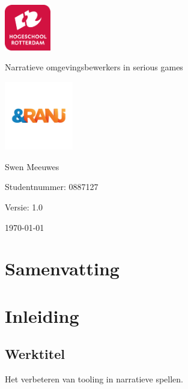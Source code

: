 \documentclass{report}
\newcommand{\versionnumber}{1.0}
\newcommand{\name}{Swen Meeuwes}
\newcommand{\studentnumber}{0887127}
\renewcommand{\title}{Narratieve omgevingsbewerkers in serious games}
\newcommand{\subtitle}{}
\begin{document}
\begin{titlepage}
        \centering
        \includegraphics[width=2cm]{Images/University}\par
        \vspace{4\baselineskip}
        {\Huge\title\par}
        {\Large\subtitle\par}
        \par
        \includegraphics[width=3cm]{Images/Organisation}
        \vspace{4\baselineskip}
        \par
        {\Large\name\par}
        {Studentnummer: \studentnumber\par}
        \vfill
        {\hfill Versie: \versionnumber\par}
        {\hfill \today}
\end{titlepage}

\chapter*{Samenvatting}

\newpage

\tableofcontents

\chapter{Inleiding}
\section{Werktitel}
Het verbeteren van tooling in narratieve spellen. %
\end{document}
